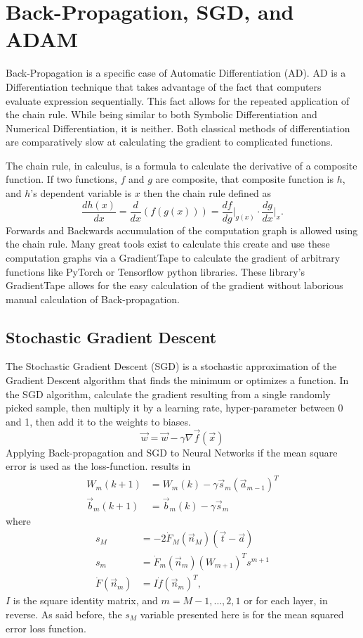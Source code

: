 \documentclass{article}
\begin{document}
\section{Back-Propagation, SGD, and ADAM}

Back-Propagation is a specific case of Automatic Differentiation (AD). AD is a Differentiation technique that takes advantage of the fact that computers evaluate expression sequentially. This fact allows for the repeated application of the chain rule. While being similar to both Symbolic Differentiation and Numerical Differentiation, it is neither. Both classical methods of differentiation are comparatively slow at calculating the gradient to complicated functions. 

The chain rule, in calculus, is a formula to calculate the derivative of a composite function. If two functions, $f$ and $g$ are composite, that composite function is $h$, and $h$'s dependent variable is $x$ then the chain rule defined as 
$$\frac{dh(x)}{dx}=\frac{d}{dx}(f(g(x)))=\frac{df}{dg}\bigg|_{g(x)}\cdot\frac{dg}{dx}\bigg|_{x}.$$ Forwards and Backwards accumulation of the computation graph is allowed using the chain rule. Many great tools exist to calculate this create and use these computation graphs via a GradientTape to calculate the gradient of arbitrary functions like PyTorch or Tensorflow python libraries. These library's GradientTape allows for the easy calculation of the gradient without laborious manual calculation of Back-propagation.

\subsection{Stochastic Gradient Descent}

The Stochastic Gradient Descent (SGD) is a stochastic approximation of the Gradient Descent algorithm that finds the minimum or optimizes a function. In the SGD algorithm, calculate the gradient resulting from a single randomly picked sample, then multiply it by a learning rate, hyper-parameter between 0 and 1, then add it to the weights to biases. $$\vec{w}=\vec{w}-\gamma\nabla \vec{f}(\vec{x})$$ Applying Back-propagation and SGD to Neural Networks if the mean square error is used as the loss-function. results in 
\begin{align*}
W_{m}(k+1)&=W_{m}(k)-\gamma \vec{s}_m (\vec{a}_{m-1})^T\\
\vec{b}_m(k+1)&=\vec{b}_{m}(k)-\gamma \vec{s}_m
\end{align*} where
\begin{align*}
s_{M}&=-2\dot{F}_M(\vec{n}_M)(\vec{t}-\vec{a})\\
s_m&=\dot{F}_m(\vec{n}_m)(W_{m+1})^T s^{m+1}\\
\dot{F}(\vec{n}_m)&=I\dot{f}(\vec{n}_m)^T,
\end{align*} $I$ is the square identity matrix, and $m=M-1,\dots, 2, 1$ or for each layer, in reverse. As said before, the $s_M$ variable presented here is for the mean squared error loss function.
\end{document}
